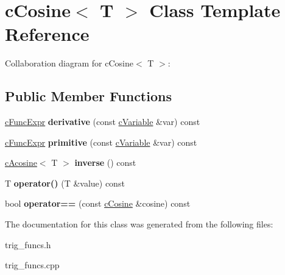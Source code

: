 \hypertarget{classcCosine}{\section{c\-Cosine$<$ T $>$ Class Template Reference}
\label{classcCosine}
}


Collaboration diagram for c\-Cosine$<$ T $>$\-:
\subsection*{Public Member Functions}
\begin{DoxyCompactItemize}
\item 
\hypertarget{classcCosine_acca166d30a61b7532f6f4388a043a737}{\hyperlink{classcFuncExpr}{c\-Func\-Expr} {\bfseries derivative} (const \hyperlink{classcVariable}{c\-Variable} \&var) const }\label{classcCosine_acca166d30a61b7532f6f4388a043a737}

\item 
\hypertarget{classcCosine_af629561afef089f15e69102ca3132f04}{\hyperlink{classcFuncExpr}{c\-Func\-Expr} {\bfseries primitive} (const \hyperlink{classcVariable}{c\-Variable} \&var) const }\label{classcCosine_af629561afef089f15e69102ca3132f04}

\item 
\hypertarget{classcCosine_a9b1e454e7ea5d543179fba4457adf945}{\hyperlink{classcAcosine}{c\-Acosine}$<$ T $>$ {\bfseries inverse} () const }\label{classcCosine_a9b1e454e7ea5d543179fba4457adf945}

\item 
\hypertarget{classcCosine_aea70b2df7ead71f06203ba672594dca7}{T {\bfseries operator()} (T \&value) const }\label{classcCosine_aea70b2df7ead71f06203ba672594dca7}

\item 
\hypertarget{classcCosine_a321947032d3527f902155660fa28f985}{bool {\bfseries operator==} (const \hyperlink{classcCosine}{c\-Cosine} \&cosine) const }\label{classcCosine_a321947032d3527f902155660fa28f985}

\end{DoxyCompactItemize}


The documentation for this class was generated from the following files\-:\begin{DoxyCompactItemize}
\item 
trig\-\_\-funcs.\-h\item 
trig\-\_\-funcs.\-cpp\end{DoxyCompactItemize}

